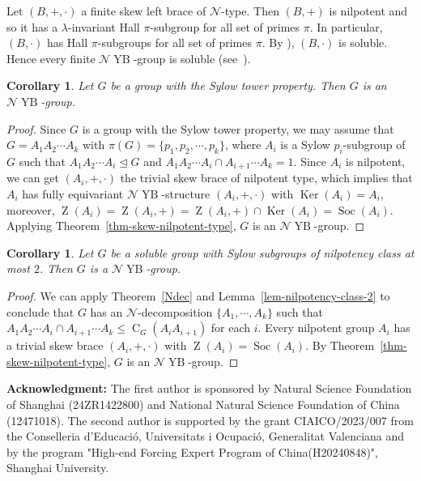 \documentclass[12pt,a4paper]{article}
\DeclareMathOperator{\C}{C}
\DeclareMathOperator{\Soc}{Soc}
\DeclareMathOperator{\Z}{Z}
\DeclareMathOperator{\Ker}{Ker}
\DeclareMathOperator{\YB}{YB}
\newtheorem{corollary}[theorem]{Corollary}
\theoremstyle{definition}
\begin{document}
Let $(B,+,\cdot)$ a finite skew left brace of $\mathcal{N}$-type. Then $(B,+)$ is nilpotent and so it has a $\lambda$-invariant Hall $\pi$-subgroup for all set of primes $\pi$. In particular, $(B,\cdot)$ has Hall $\pi$-subgroups for all set of primes $\pi$. By \cite[Theorems~I.3.3 and~I.3.5]{DoerkHawkes1992}), $(B,\cdot)$ is soluble. Hence every finite $\mathcal{N}\YB$-group is soluble (see~\cite{Byott2015}).



\begin{corollary}
Let $G$ be a group with the Sylow tower property. Then $G$ is an $\mathcal{N}\YB$-group.
\end{corollary}
\begin{proof}
Since $G$ is a group with the Sylow tower property, we may assume that $G=A_1A_2\cdots A_k$ with $\pi(G)=\{p_1,p_2,\cdots,p_k\}$, where $A_i$ is a Sylow $p_i$-subgroup of $G$ such that $A_1A_2\cdots A_i \unlhd G$ and $A_1A_2\cdots A_i \cap A_{i+1}\cdots A_k=1$. Since $A_i$ is nilpotent, we can get $(A_i,+,\cdot)$ the trivial skew brace of nilpotent type, which implies that $A_i$ has fully equivariant $\mathcal{N}\YB$-structure $(A_i,+,\cdot)$ with $\Ker(A_i)=A_i$, moreover, $\Z(A_i)=\Z(A_i,+)=\Z(A_i,+) \cap \Ker(A_i)=\Soc(A_i)$.
Applying Theorem~\ref{thm-skew-nilpotent-type}, $G$ is an $\mathcal{N}\YB$-group.
\end{proof}

\begin{corollary}
Let $G$ be a soluble group with Sylow subgroups
of nilpotency class at most $2$. Then $G$ is a $\mathcal{N}\YB$-group.
\end{corollary}
\begin{proof}
We can apply Theorem~\ref{Ndec} and Lemma~\ref{lem-nilpotency-class-2} to conclude that 
$G$ has an $\mathcal{N}$-decomposition $\{A_1,\cdots,A_k\}$ such that
$A_1A_2\cdots A_i \cap A_{i+1}\cdots A_k \leq \C_G(A_iA_{i+1})$ for each $i$. Every nilpotent group $A_i$ has a trivial skew brace $(A_i,+,\cdot)$ with $\Z(A_i)=\Soc(A_i)$. By Theorem~\ref{thm-skew-nilpotent-type}, $G$ is an $\mathcal{N}\YB$-group.
\end{proof}



\textbf{Acknowledgment:} The first author is sponsored by Natural Science Foundation of Shanghai
(24ZR1422800) and National Natural Science Foundation of China (12471018). The second author is supported by the grant CIAICO/2023/007 from the Conselleria d'Educaci\'o, Universitats i Ocupaci\'o, Generalitat Valenciana and by the program "High-end Forcing Expert Program of China(H20240848)", Shanghai University.









\end{document}
